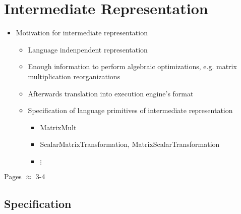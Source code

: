 \chapter{Intermediate Representation}
\label{cha:intermediaterepresentation}

\begin{itemize}
	\item Motivation for intermediate representation
	\begin{itemize}
		\item Language indenpendent representation
		\item Enough information to perform algebraic optimizations, e.g. matrix multiplication reorganizations
		\item Afterwards translation into execution engine's format
		\item Specification of language primitives of intermediate representation
		\begin{itemize}
			\item MatrixMult
			\item ScalarMatrixTransformation, MatrixScalarTransformation
			\item $\vdots$
		\end{itemize}
	\end{itemize}
\end{itemize}

Pages $\approx$ 3-4

\section{Specification}